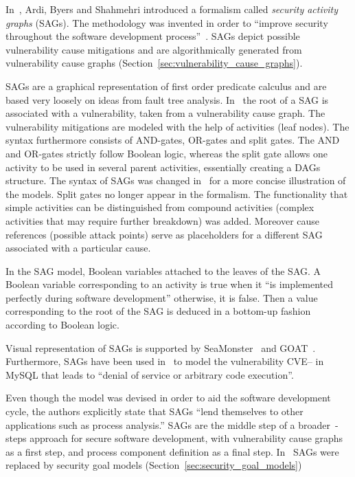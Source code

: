 \documentclass[a4paper]{article}
\begin{document}
In~, Ardi, Byers and Shahmehri introduced a formalism called
\emph{security activity graphs} (SAGs). The methodology was invented in order to
``improve security throughout the software development process''~\cite{ArBySh}.
SAGs depict possible vulnerability cause mitigations and are algorithmically
generated from vulnerability cause graphs
(Section~\ref{sec:vulnerability_cause_graphs}).

SAGs are a graphical representation of first order predicate calculus and are
based very loosely on ideas from fault tree analysis. In~\cite{ArBySh} the root
of a SAG is associated with a vulnerability, taken from a vulnerability cause
graph. The vulnerability mitigations are modeled with the help of activities
(leaf nodes). The syntax furthermore consists of AND-gates, OR-gates and split
gates. The AND and OR-gates strictly follow Boolean logic, whereas the split
gate allows one activity to be used in several parent activities, essentially
creating a DAGs structure. The syntax of SAGs was changed in~\cite{BySh2} for a
more concise illustration of the models. Split gates no longer appear in the
formalism. The functionality that simple activities can be distinguished from
compound activities (complex activities that may require further breakdown) was
added. Moreover cause references (possible attack points) serve as placeholders
for a different SAG associated with a particular cause.

In the SAG model, Boolean variables attached to the leaves of the SAG. A 
Boolean variable corresponding to an activity is true when it ``is implemented 
perfectly during software development'' otherwise, it is false. Then a value 
corresponding to the root of the SAG is deduced in a bottom-up fashion 
according to Boolean logic.

Visual representation of SAGs is supported by SeaMonster~\cite{MeSpHaBaKrVe} and
GOAT~\cite{GOAT}. Furthermore, SAGs have been used in~\cite{BySh2,BySh3} to 
model the vulnerability CVE-- in MySQL that leads to ``denial of 
service or arbitrary code execution''.

Even though the model was devised in order to aid the software development
cycle, the authors explicitly state that SAGs ``lend themselves to other
applications such as process analysis.'' SAGs are the middle step of a
broader~-steps approach for secure software development, with vulnerability 
cause graphs as a first step, and process component definition as a final step. 
In~ SAGs were replaced by security goal models 
(Section~\ref{sec:security_goal_models})
\end{document}

